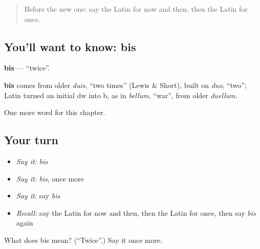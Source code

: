 \label{lesson:LA-C176-bis}



\begin{quote}
Before the new one: say the Latin for now and then, then the Latin for once.
\end{quote}

\subsection*{You'll want to know: bis}
\textbf{bis} — \textquotedblleft{}twice\textquotedblright{}.

\begin{cousinweb}
\textbf{bis} comes from older \emph{duis}, \textquotedblleft{}two times\textquotedblright{} (Lewis \& Short), built on \emph{duo}, \textquotedblleft{}two\textquotedblright{}; Latin turned an initial dw into b, as in \emph{bellum}, \textquotedblleft{}war\textquotedblright{}, from older \emph{duellum}.
\end{cousinweb}

\begin{grammarlens}[title={What you've built}]
One more word for this chapter.
\end{grammarlens}

\subsection*{Your turn}
\begin{itemize}
\raggedright
  \item \emph{Say it:} \emph{bis}
  \item \emph{Say it:} \emph{bis}, once more
  \item \emph{Say it:} say \emph{bis}
  \item \emph{Recall:} say the Latin for now and then, then the Latin for once, then say \emph{bis} again
\end{itemize}

\begin{tcolorbox}[breakable,colback=teal!4,colframe=teal!35!black,title={Before you move on}]
What does bis mean? (\textquotedblleft{}Twice\textquotedblright{}.) Say it once more.
\end{tcolorbox}

